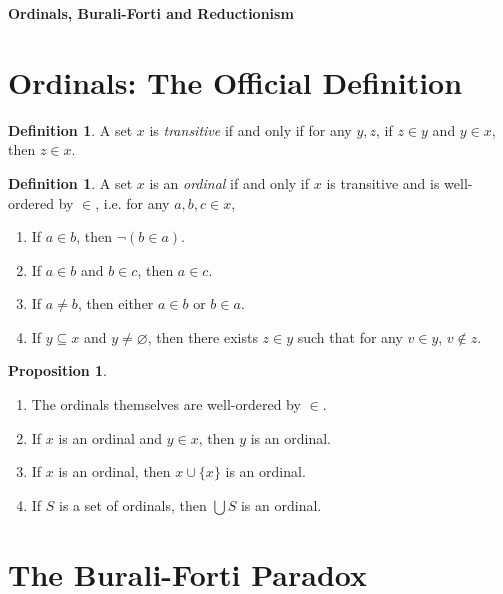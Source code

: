 \documentclass[12pt]{article}
\theoremstyle{definition}
\newtheorem{defin}[theo]{Definition}
\newtheorem{prop}[theo]{Proposition}
\begin{document}




\begin{center}
{\Large \bf Ordinals, Burali-Forti and Reductionism}
\end{center}

\smallskip

\section{Ordinals: The Official Definition}

\begin{defin}
A set $x$ is \textit{transitive} if and only if for any $y, z$, if $z \in y$ and $y \in x$, then $z \in x$.
\end{defin}

\begin{defin}
A set $x$ is an \textit{ordinal} if and only if $x$ is transitive and is well-ordered by $\in$, i.e. for any $a, b, c \in x$, 
\begin{enumerate} [leftmargin = 2cm]
\item[(1)] If $a \in b$, then $\neg (b \in a)$.
\item[(2)] If $a \in b$ and $b \in c$, then $a \in c$.
\item[(3)] If $a \neq b$, then either $a \in b$ or $b \in a$.
\item[(4)] If $y \subseteq x$ and $y \neq \varnothing$, then there exists $z \in y$ such that for any $v \in y$, $v \notin z$.
\end{enumerate}
\end{defin}

\begin{prop}
\begin{enumerate}
\item[(i)]The ordinals themselves are well-ordered by $\in$.
\item[(ii)] If $x$ is an ordinal and $y \in x$, then $y$ is an ordinal.
\item[(iii)] If $x$ is an ordinal, then $x \cup \{x\}$ is an ordinal.
\item[(iv)] If $S$ is a set of ordinals, then $\bigcup S$ is an ordinal. 
\end{enumerate}
\end{prop}

\section{The Burali-Forti Paradox}
\end{document}
